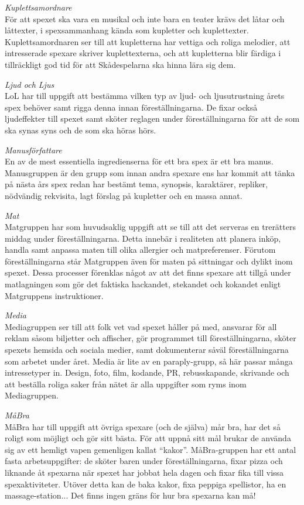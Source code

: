 {\Large\textit{Kuplettsamordnare}} \\
För att spexet ska vara en musikal och inte bara en teater krävs det låtar och låttexter, i spexsammanhang kända som kupletter och kuplettexter. Kuplettsamordnaren ser till att kupletterna har vettiga och roliga melodier, att intresserade spexare skriver kuplettexterna, och att kupletterna blir färdiga i tillräckligt god tid för att Skådespelarna ska hinna lära sig dem.


{\Large\textit{Ljud och Ljus}} \\
LoL har till uppgift att bestämma vilken typ av ljud- och ljusutrustning årets spex behöver samt rigga denna innan föreställningarna. De fixar också ljudeffekter till spexet samt sköter reglagen under föreställningarna för att de som ska synas syns och de som ska höras hörs.


{\Large\textit{Manusförfattare}} \\
En av de mest essentiella ingredienserna för ett bra spex är ett bra manus. Manusgruppen är den grupp som innan andra spexare ens har kommit att tänka på nästa års spex redan har bestämt tema, synopsis, karaktärer, repliker, nödvändig rekvisita, lagt förslag på kupletter och en massa annat.

{\Large\textit{Mat}} \\
Matgruppen har som huvudsaklig uppgift att se till att det serveras en trerätters middag under föreställningarna. Detta innebär i realiteten att planera inköp, handla samt anpassa maten till olika allergier och matpreferenser. Förutom föreställningarna står Matgruppen även för maten på sittningar och dylikt inom spexet. Dessa processer förenklas något av att det finns spexare att tillgå under matlagningen som gör det faktiska hackandet, stekandet och kokandet enligt Matgruppens instruktioner.

{\Large\textit{Media}} \\
Mediagruppen ser till att folk vet vad spexet håller på med, ansvarar för all reklam såsom biljetter och affischer, gör programmet till föreställningarna, sköter spexets hemsida och sociala medier, samt dokumenterar såväl föreställningarna som arbetet under året. Media är lite av en paraply-grupp, så här passar många intressetyper in. Design, foto, film, kodande, PR, rebusskapande, skrivande och att beställa roliga saker från nätet är alla uppgifter som ryms inom Mediagruppen.

\newpage

{\Large\textit{MåBra}} \\
MåBra har till uppgift att övriga spexare (och de själva) mår bra, har det så roligt som möjligt och gör sitt bästa. För att uppnå sitt mål brukar de använda sig av ett hemligt vapen gemenligen kallat ``kakor”. MåBra-gruppen har ett antal fasta arbetsuppgifter: de sköter baren under föreställningarna, fixar pizza och liknande åt spexarna när spexet har jobbat hela dagen och fixar fika till vissa spexaktiviteter. Utöver detta kan de baka kakor, fixa peppiga spellistor, ha en massage-station... Det finns ingen gräns för hur bra spexarna kan må!


